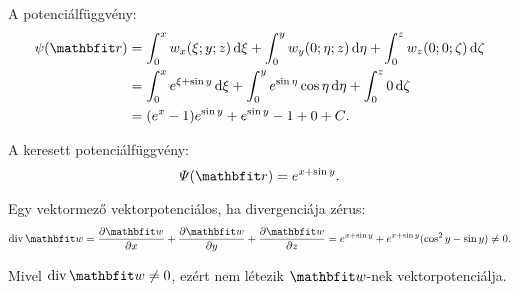 \documentclass[lang=magyar]{math-handout}
\begin{document}
\begin{exercise}
{\begin{enumerate}[a)]
\begin{itemize}
                    A potenciálfüggvény:
                    \begin{align*}
                      \psi(\rvec r)
                       & =
                      \int_0^x w_x(\xi; y; z) \,\diff \xi +
                      \int_0^y w_y(0; \eta; z) \,\diff \eta +
                      \int_0^z w_z(0; 0; \zeta) \,\diff \zeta
                      \\
                       & =
                      \int_0^x e^{\xi + \sin y} \,\diff \xi +
                      \int_0^y e^{\sin \eta} \cos \eta \,\diff \eta +
                      \int_0^z 0 \,\diff \zeta
                      \\
                       & =
                      (e^x - 1) e^{\sin y} + e^{\sin y} - 1 + 0 + C
                      \text.
                    \end{align*}

                    A keresett potenciálfüggvény:
                    \[
                      \varPsi(\rvec r)
                      =
                      e^{x + \sin y}
                      \text.
                    \]

                    Egy vektormező vektorpotenciálos, ha divergenciája zérus:
                    \[
                      \Div \rvec w
                      =
                      \pdv{\rvec w}{x} + \pdv{\rvec w}{y} + \pdv{\rvec w}{z}
                      =
                      e^{x + \sin y} + e^{x + \sin y}(\cos^2 y - \sin y)
                      \neq 0
                      \text.
                    \]

                    Mivel $\Div \rvec w \neq 0$, ezért nem létezik $\rvec w$-nek
                    vektorpotenciálja.
            \end{itemize}


\end{enumerate}}
\end{exercise}
\end{document}
